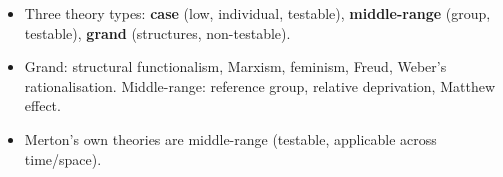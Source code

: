 \begin{QuickRevision}
\begin{itemize}
\item Three theory types: \textbf{case} (low, individual, testable), \textbf{middle-range} (group, testable), \textbf{grand} (structures, non-testable).
\item Grand: structural functionalism, Marxism, feminism, Freud, Weber's rationalisation. Middle-range: reference group, relative deprivation, Matthew effect.
\item Merton's own theories are middle-range (testable, applicable across time/space).
\end{itemize}
\end{QuickRevision}